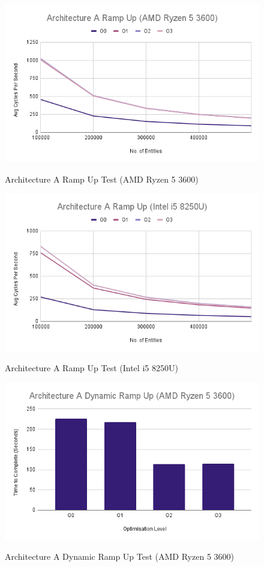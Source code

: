 \documentclass{article}
\begin{document}
\begin{figure}[!h]
\centering
\includegraphics[scale=0.5]{Architecture A Ramp Up (AMD Ryzen 5 3600).png}
\label{arch_a_ramp_up_pc}
\caption{Architecture A Ramp Up Test (AMD Ryzen 5 3600)}
\end{figure}

\begin{figure}[!h]
\centering
\includegraphics[scale=0.5]{Architecture A Ramp Up (Intel i5 8250U).png}
\label{arch_a_ramp_up_laptop}
\caption{Architecture A Ramp Up Test (Intel i5 8250U)}
\end{figure}

\begin{figure}[!h]
\centering
\includegraphics[scale=0.5]{Architecture A Dynamic Ramp Up (AMD Ryzen 5 3600).png}
\label{arch_a_dynamic_ramp_up_pc}
\caption{Architecture A Dynamic Ramp Up Test (AMD Ryzen 5 3600)}
\end{figure}
\end{document}
